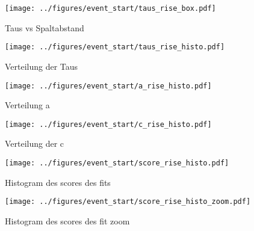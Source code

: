 \begin{figure}[H]                                                                                 \centering
    \begin{minipage}[t]{0.44\textwidth}
        \centering
        \texttt{[image: ../figures/event\_start/taus\_rise\_box.pdf]}
        \caption{Taus vs Spaltabstand}
        \label{fig:taus_rise_box}                                                               
    \end{minipage}
    \hfill
    \begin{minipage}[t]{0.44\textwidth}
        \centering
        \texttt{[image: ../figures/event\_start/taus\_rise\_histo.pdf]}
        \caption{Verteilung der Taus}
        \label{fig:taus_rise_histo}
    \end{minipage}
\end{figure}


\begin{figure}[H]
    \centering
    \begin{minipage}[t]{0.44\textwidth}
        \centering
        \texttt{[image: ../figures/event\_start/a\_rise\_histo.pdf]}
        \caption{Verteilung a}
        \label{fig:a_rise_histo}
    \end{minipage}
    \hfill
    \begin{minipage}[t]{0.44\textwidth}
        \centering
        \texttt{[image: ../figures/event\_start/c\_rise\_histo.pdf]}
        \caption{Verteilung der c}
        \label{fig:c_rise_histo}
    \end{minipage}
\end{figure}





\begin{figure}[H]
    \centering
    \begin{minipage}[t]{0.44\textwidth}
        \centering
        \texttt{[image: ../figures/event\_start/score\_rise\_histo.pdf]}
        \caption{Histogram des scores des fits}
        \label{fig:score_rise_histo}
    \end{minipage}
    \hfill
    \begin{minipage}[t]{0.44\textwidth}
        \centering
        \texttt{[image: ../figures/event\_start/score\_rise\_histo\_zoom.pdf]}
        \caption{Histogram des scores des fit zoom}
        \label{fig:score_rise_histo_zoom}
    \end{minipage}
\end{figure}

